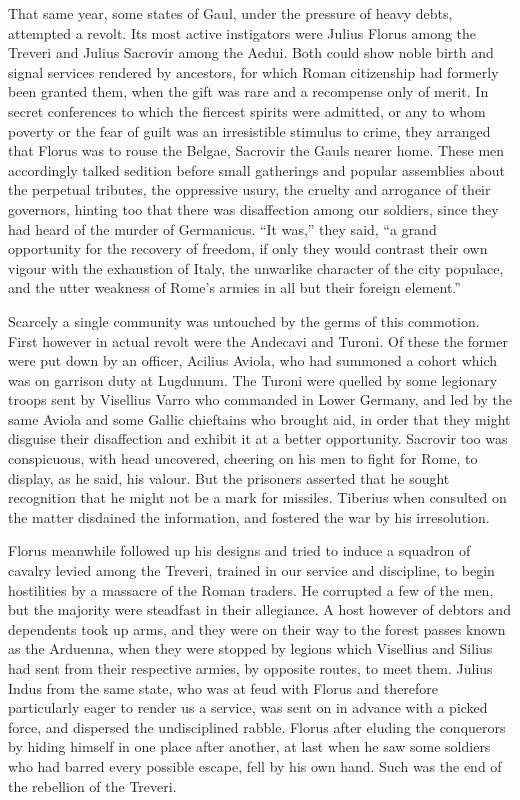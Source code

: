 That same year, some states of Gaul, under the pressure of heavy debts, attempted a revolt. Its most active instigators were Julius Florus among the Treveri and Julius Sacrovir among the Aedui. Both could show noble birth and signal services rendered by ancestors, for which Roman citizenship had formerly been granted them, when the gift was rare and a recompense only of merit. In secret conferences to which the fiercest spirits were admitted, or any to whom poverty or the fear of guilt was an irresistible stimulus to crime, they arranged that Florus was to rouse the Belgae, Sacrovir the Gauls nearer home. These men accordingly talked sedition before small gatherings and popular assemblies about the perpetual tributes, the oppressive usury, the cruelty and arrogance of their governors, hinting too that there was disaffection among our soldiers, since they had heard of the murder of Germanicus. ``It was,'' they said, ``a grand opportunity for the recovery of freedom, if only they would contrast their own vigour with the exhaustion of Italy, the unwarlike character of the city populace, and the utter weakness of Rome's armies in all but their foreign element.''


Scarcely a single community was untouched by the germs of this commotion. First however in actual revolt were the Andecavi and Turoni. Of these the former were put down by an officer, Acilius Aviola, who had summoned a cohort which was on garrison duty at Lugdunum. The Turoni were quelled by some legionary troops sent by Visellius Varro who commanded in Lower Germany, and led by the same Aviola and some Gallic chieftains who brought aid, in order that they might disguise their disaffection and exhibit it at a better opportunity. Sacrovir too was conspicuous, with head uncovered, cheering on his men to fight for Rome, to display, as he said, his valour. But the prisoners asserted that he sought recognition that he might not be a mark for missiles. Tiberius when consulted on the matter disdained the information, and fostered the war by his irresolution.


Florus meanwhile followed up his designs and tried to induce a squadron of cavalry levied among the Treveri, trained in our service and discipline, to begin hostilities by a massacre of the Roman traders. He corrupted a few of the men, but the majority were steadfast in their allegiance. A host however of debtors and dependents took up arms, and they were on their way to the forest passes known as the Arduenna, when they were stopped by legions which Visellius and Silius had sent from their respective armies, by opposite routes, to meet them. Julius Indus from the same state, who was at feud with Florus and therefore particularly eager to render us a service, was sent on in advance with a picked force, and dispersed the undisciplined rabble. Florus after eluding the conquerors by hiding himself in one place after another, at last when he saw some soldiers who had barred every possible escape, fell by his own hand. Such was the end of the rebellion of the Treveri.


